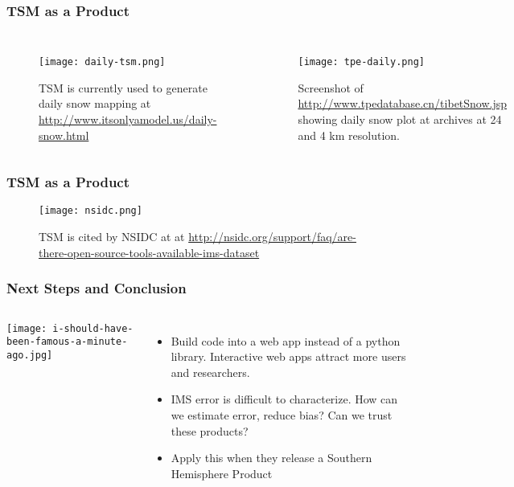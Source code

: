 \begin{frame}
\frametitle{TSM as a Product}
\begin{columns}
\begin{figure}
\vspace*{-1cm}
\centering
\begin{minipage}{1\columnwidth}
\texttt{[image: daily-tsm.png]}
\caption{TSM is currently used to generate daily snow mapping at \url{http://www.itsonlyamodel.us/daily-snow.html}}
\end{minipage}
\end{figure}
\begin{figure}
\vspace*{-.25cm}
\centering
\begin{minipage}{1\columnwidth}
\texttt{[image: tpe-daily.png]}
\caption{Screenshot of \url{http://www.tpedatabase.cn/tibetSnow.jsp} showing daily snow plot at archives at 24 and 4 km resolution.}
\end{minipage}
\end{figure}
\end{columns}
\end{frame}

\begin{frame}
\frametitle{TSM as a Product}
\begin{figure}
\vspace*{-1cm}
\centering
\begin{minipage}{1\columnwidth}
\texttt{[image: nsidc.png]}
\caption{TSM is cited by NSIDC at at \url{http://nsidc.org/support/faq/are-there-open-source-tools-available-ims-dataset}}
\end{minipage}
\end{figure}
\end{frame}

\begin{frame}
\frametitle{Next Steps and Conclusion}
\begin{columns}
\texttt{[image: i-should-have-been-famous-a-minute-ago.jpg]}
\begin{itemize}
    \item Build code into a web app instead of a python library. Interactive web apps attract more users and researchers.
    \item IMS error is difficult to characterize. How can we estimate error, reduce bias? Can we trust these products?
    \item Apply this when they release a Southern Hemisphere Product
\end{itemize}
\end{columns}
\end{frame}